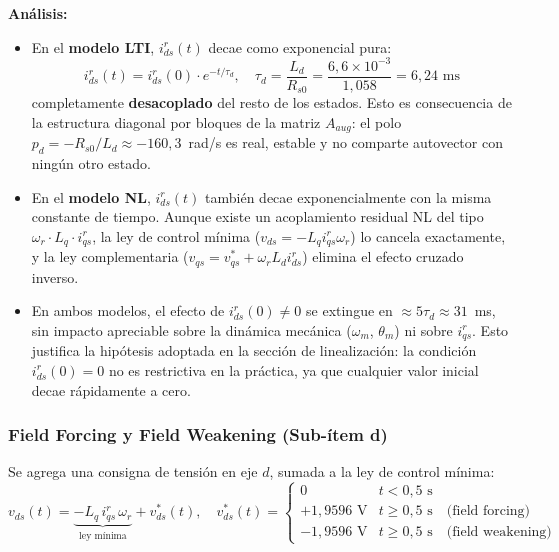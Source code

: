 \documentclass[12pt, a4paper,journal, onecolumn, compsoc]{IEEEtran}
\begin{document}
\textbf{Análisis:}
\begin{itemize}
    \item En el \textbf{modelo LTI}, $i_{ds}^r(t)$ decae como exponencial pura:
    \begin{equation}
        i_{ds}^r(t) = i_{ds}^r(0) \cdot e^{-t/\tau_d}, \quad \tau_d = \frac{L_d}{R_{s0}} = \frac{6{,}6 \times 10^{-3}}{1{,}058} = 6{,}24 \text{ ms}
    \end{equation}
    completamente \textbf{desacoplado} del resto de los estados. Esto es consecuencia de la estructura diagonal por bloques de la matriz $A_{aug}$: el polo $p_d = -R_{s0}/L_d \approx -160{,}3$~rad/s es real, estable y no comparte autovector con ningún otro estado.

    \item En el \textbf{modelo NL}, $i_{ds}^r(t)$ también decae exponencialmente con la misma constante de tiempo. Aunque existe un acoplamiento residual NL del tipo $\omega_r \cdot L_q \cdot i_{qs}^r$, la ley de control mínima ($v_{ds} = -L_q i_{qs}^r \omega_r$) lo cancela exactamente, y la ley complementaria ($v_{qs} = v_{qs}^* + \omega_r L_d i_{ds}^r$) elimina el efecto cruzado inverso.

    \item En ambos modelos, el efecto de $i_{ds}^r(0) \neq 0$ se extingue en $\approx 5\tau_d \approx 31$~ms, sin impacto apreciable sobre la dinámica mecánica ($\omega_m$, $\theta_m$) ni sobre $i_{qs}^r$. Esto justifica la hipótesis adoptada en la sección de linealización: la condición $i_{ds}^r(0) = 0$ no es restrictiva en la práctica, ya que cualquier valor inicial decae rápidamente a cero.
\end{itemize}

\subsubsection{Field Forcing y Field Weakening (Sub-ítem d)}
\label{sec:sim_item_d}

Se agrega una consigna de tensión en eje $d$, sumada a la ley de control mínima:
\begin{equation}
    v_{ds}(t) = \underbrace{-L_q \, i_{qs}^r \, \omega_r}_{\text{ley mínima}} + v_{ds}^*(t), \quad
    v_{ds}^*(t) = \begin{cases}
    0 & t < 0{,}5 \text{ s} \\
    +1{,}9596 \text{ V} & t \geq 0{,}5 \text{ s} \quad \text{(field forcing)}\\
    -1{,}9596 \text{ V} & t \geq 0{,}5 \text{ s} \quad \text{(field weakening)}
    \end{cases}
\end{equation}
\end{document}
